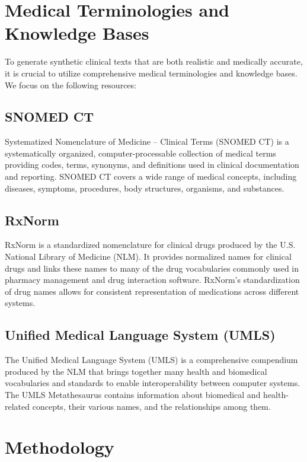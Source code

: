 \documentclass[12pt, a4paper]{article}
\begin{document}
\section{Medical Terminologies and Knowledge Bases}

To generate synthetic clinical texts that are both realistic and medically accurate, it is crucial to utilize comprehensive medical terminologies and knowledge bases. We focus on the following resources:

\subsection{SNOMED CT}

Systematized Nomenclature of Medicine -- Clinical Terms (SNOMED CT) is a systematically organized, computer-processable collection of medical terms providing codes, terms, synonyms, and definitions used in clinical documentation and reporting. SNOMED CT covers a wide range of medical concepts, including diseases, symptoms, procedures, body structures, organisms, and substances.

\subsection{RxNorm}

RxNorm is a standardized nomenclature for clinical drugs produced by the U.S. National Library of Medicine (NLM). It provides normalized names for clinical drugs and links these names to many of the drug vocabularies commonly used in pharmacy management and drug interaction software. RxNorm's standardization of drug names allows for consistent representation of medications across different systems.

\subsection{Unified Medical Language System (UMLS)}

The Unified Medical Language System (UMLS) is a comprehensive compendium produced by the NLM that brings together many health and biomedical vocabularies and standards to enable interoperability between computer systems. The UMLS Metathesaurus contains information about biomedical and health-related concepts, their various names, and the relationships among them.

\section{Methodology}
\end{document}
